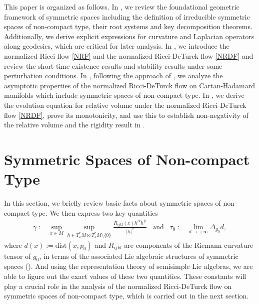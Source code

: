 \documentclass[12pt]{amsart}
\begin{document}
This paper is organized as follows. In , we review the foundational geometric framework of symmetric spaces including the definition of irreducible symmetric spaces of non-compact type, their root systems and key decomposition theorems. Additionally, we derive explicit expressions for curvature and Laplacian operators along geodesics, which are critical for later analysis. In , we introduce the normalized Ricci flow \eqref{NRF} and the normalized Ricci-DeTurck flow \eqref{NRDF} and review the short-time existence results and stability results under some perturbation conditions. In , following the approach of \cite{HJS2016}, we analyze the asymptotic properties of the normalized Ricci-DeTurck flow on Cartan-Hadamard manifolds which include symmetric spaces of non-compact type. In , we derive the evolution equation for relative volume under the normalized Ricci-DeTurck flow \eqref{NRDF}, prove its monotonicity, and use this to establish non-negativity of the relative volume and the rigidity result in .

\section{Symmetric Spaces of Non-compact Type}\label{sec: symmetric_space}

In this section, we briefly review basic facts about symmetric spaces of non-compact type. We then express two key quantities 
\begin{align}\label{two important quantities}
    \gamma := \sup_{x \in M} \sup_{h \in T_x^*M \otimes T_x^*M \setminus \{0\}} \frac{R_{ijkl}(x) h^{ik} h^{jl}}{|h|^2}\;\;\; \text{and}\;\;\; \tau_0 := \lim_{d\rightarrow +\infty} \Delta_{g_0} d,
\end{align}
where $d(x) := \text{dist}(x, p_0)$ and $R_{ijkl}$ are components of the Riemann curvature tensor of $g_0$, in terms of the associated Lie algebraic structures of symmetric spaces (). And using the representation theory of semisimple Lie algebras, we are able to figure out the exact values of these two quantities. These constants will play a crucial role in the analysis of the normalized Ricci-DeTurck flow on symmetric spaces of non-compact type, which is carried out in the next section.
\end{document}
